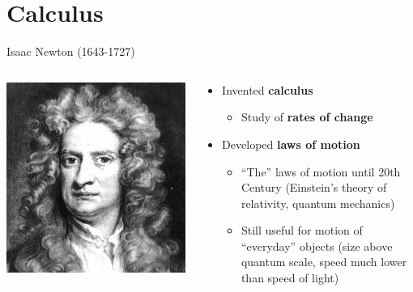 \part{Calculus}
\frame{\partpage}

\begin{frame}{Isaac Newton (1643-1727)}
	\begin{columns}
		\begin{column}{0.2\textwidth}
			\includegraphics[width=\textwidth]{isaac_newton}
		\end{column}
		\begin{column}{0.78\textwidth}
			\begin{itemize}
				\pause\item Invented \textbf{calculus}
					\begin{itemize}
						\pause\item Study of \textbf{rates of change}
					\end{itemize}
				\pause\item Developed \textbf{laws of motion}
					\begin{itemize}
						\pause\item ``The'' laws of motion until 20th Century (Einstein's theory of relativity, quantum mechanics)
						\pause\item Still useful for motion of ``everyday'' objects (size above quantum scale, speed much lower than speed of light)

\end{itemize}
\end{itemize}
\end{column}
\end{columns}
\end{frame}
